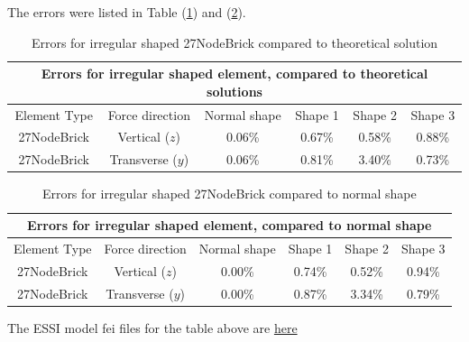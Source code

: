 \documentclass[fleqn,11pt,letter]{article}
\begin{document}
The errors were listed in Table (\ref{table Errors for irregular shaped 27NodeBrick compared to theoretical solution}) and (\ref{talbe Errors for irregular shaped 27NodeBrick compared to normal shape}).


\begin{table}[H]
  \centering
  \caption{Errors for irregular shaped 27NodeBrick compared to theoretical solution}
  \label{table Errors for irregular shaped 27NodeBrick compared to theoretical solution}
  \begin{tabular}{|c|c|c|c|c|c|}
    \hline 
    \multicolumn{6}{|c|}{Errors for irregular shaped element, compared to theoretical solutions}   \\ \hline
    Element Type   & Force direction & Normal shape & Shape 1 & Shape 2 & Shape 3  \\ \hline 
    27NodeBrick     & Vertical ($z$)     & 0.06\% & 0.67\% & 0.58\% & 0.88\%  \\ \hline
    27NodeBrick     & Transverse ($y$)   & 0.06\% & 0.81\% & 3.40\% & 0.73\%  \\ \hline
  \end{tabular}
\end{table}

\begin{table}[H]
  \centering
    \caption{Errors for irregular shaped 27NodeBrick compared to normal shape}
  \label{talbe Errors for irregular shaped 27NodeBrick compared to normal shape}
  \begin{tabular}{|c|c|c|c|c|c|}
    \hline 
    \multicolumn{6}{|c|}{Errors for irregular shaped element, compared to normal shape}   \\ \hline
    Element Type   & Force direction & Normal shape & Shape 1 & Shape 2 & Shape 3  \\ \hline 
    27NodeBrick     & Vertical ($z$)    & 0.00\% & 0.74\% & 0.52\% & 0.94\%       \\ \hline
    27NodeBrick     & Transverse ($y$)  & 0.00\% & 0.87\% & 3.34\% & 0.79\%       \\ \hline
  \end{tabular}
\end{table}

The ESSI model fei files for the table above are \href{https://github.com/yuan-energy/ESSI_Verification/blob/master/27NodeBrick/cantilever_irregular_element/cantilever_irregular_element.tar.gz?raw=true}{here}
\end{document}
